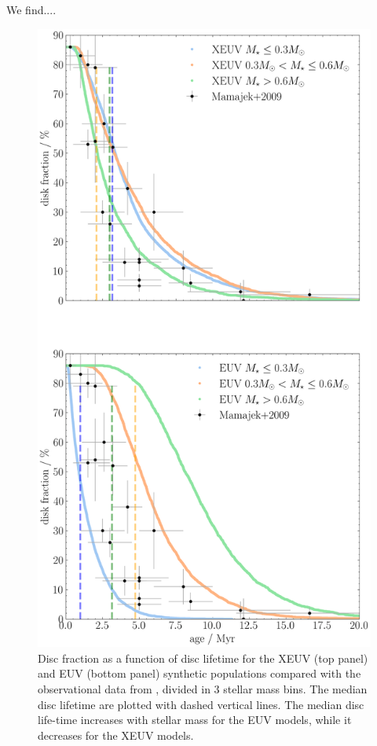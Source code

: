 \documentclass[fleqn,usenatbib,letters]{mnras}
\begin{document}
We find.... 
\begin{figure}
    \includegraphics[width=0.92\columnwidth]{Fig8}
    \caption{Disc fraction as a function of disc lifetime for the XEUV (top panel) and EUV (bottom panel) synthetic populations compared with the observational data from \citet{Mamajek2009}, divided in 3 stellar mass bins. The median disc lifetime are plotted with dashed vertical lines. The median disc life-time increases with stellar mass for the EUV models, while it decreases for the XEUV models. \label{fig:frac_time}}
\end{figure}
\end{document}
